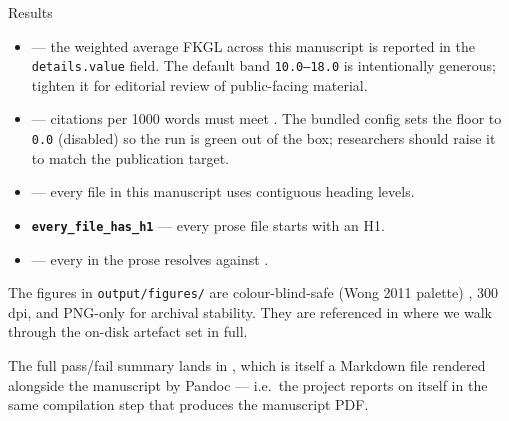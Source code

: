 \documentclass[
  ignorenonframetext,
]{beamer}
\providecommand{\tightlist}{%
  \setlength{\itemsep}{0pt}\setlength{\parskip}{0pt}}
\begin{document}
\begin{frame}{Results}
\begin{itemize}
\tightlist
\item
  \textbf{} --- the weighted average FKGL
  across this manuscript is reported in the 
  \texttt{details.value} field. The default band \texttt{10.0–18.0} is
  intentionally generous; tighten it for editorial review of
  public-facing material.
\item
  \textbf{} --- citations per
  1000 words must meet .
  The bundled config sets the floor to \texttt{0.0} (disabled) so the
  run is green out of the box; researchers should raise it to match the
  publication target.
\item
  \textbf{} --- every file in this
  manuscript uses contiguous heading levels.
\item
  \textbf{\texttt{every\_file\_has\_h1}} --- every prose file starts
  with an H1.
\item
  \textbf{} --- every
  \texttt{\breakseq{[@key]}} in the prose resolves against
  .
\end{itemize}

The figures in \texttt{output/figures/} are colour-blind-safe (Wong 2011
palette) , 300 dpi, and PNG-only for archival
stability. They are referenced in  where
we walk through the on-disk artefact set in full.

The full pass/fail summary lands in ,
which is itself a Markdown file rendered alongside the manuscript by
Pandoc --- i.e.~the project reports on itself in the same compilation
step that produces the manuscript PDF.
\end{frame}
\end{document}
